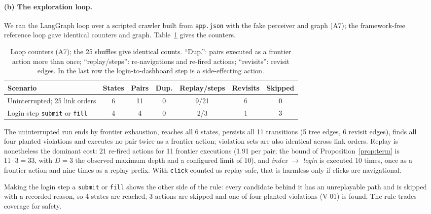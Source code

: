\paragraph{(b) The exploration loop.}
We ran the LangGraph loop over a scripted crawler built from \texttt{app.json}
with the fake perceiver and graph (A7); the framework-free reference loop gave
identical counters and graph. Table~\ref{tab:loop} gives the counters.
\begin{table}[tbp]
\caption{Loop counters (A7); the 25 shuffles give identical counts. ``Dup.'': pairs
executed as a frontier action more than once; ``replay/steps'': re-navigations and
re-fired actions; ``revisits'': revisit edges. In the last row the
login-to-dashboard step is a side-effecting action.}
\label{tab:loop}
\setlength{\tabcolsep}{3.5pt}
\footnotesize
\begin{tabular}{@{}lcccccc@{}}
\toprule
Scenario & States & Pairs & Dup. & Replay/steps & Revisits & Skipped \\
\midrule
Uninterrupted; 25 link orders & 6 & 11 & 0 & 9/21 & 6 & 0 \\
Login step \texttt{submit} or \texttt{fill} & 4 & 4 & 0 & 2/3 & 1 & 3 \\
\bottomrule
\end{tabular}
\end{table}

The uninterrupted run ends by frontier exhaustion, reaches all 6 states, persists
all 11 transitions (5 tree edges, 6 revisit edges), finds all four planted
violations and executes no pair twice as a frontier action; violation sets are
also identical across link orders. Replay is nonetheless the dominant cost: 21
re-fired actions for 11 frontier executions (1.91 per pair; the bound of
Proposition~\ref{prop:term} is $11\cdot3=33$, with $D=3$ the observed maximum
depth and a configured limit of 10), and \emph{index $\to$ login} is executed 10
times, once as a frontier action and nine times as a replay prefix. With
\texttt{click} counted as replay-safe, that is harmless only if clicks are
navigational.

Making the login step a \texttt{submit} or \texttt{fill} shows the other side of
the rule: every candidate behind it has an unreplayable path and is skipped with a
recorded reason, so 4 states are reached, 3 actions are skipped and one of four
planted violations (V-01) is found. The rule trades coverage for safety.

